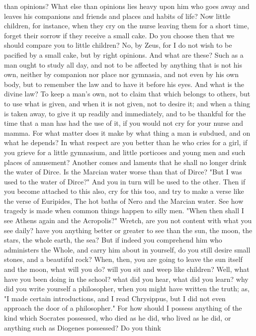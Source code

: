 \documentclass[a4paper]{article}
\begin{document}
than opinions? What else than opinions lies heavy upon him who goes away and
leaves his companions and friends and places and habits of life? Now little
children, for instance, when they cry on the nurse leaving them for a short
time, forget their sorrow if they receive a small cake. Do you choose then that
we should compare you to little children? No, by Zeus, for I do not wish to be
pacified by a small cake, but by right opinions. And what are these? Such as a
man ought to study all day, and not to be affected by anything that is not his
own, neither by companion nor place nor gymnasia, and not even by his own body,
but to remember the law and to have it before his eyes. And what is the divine
law? To keep a man's own, not to claim that which belongs to others, but to use
what is given, and when it is not given, not to desire it; and when a thing is
taken away, to give it up readily and immediately, and to be thankful for the
time that a man has had the use of it, if you would not cry for your nurse and
mamma. For what matter does it make by what thing a man is subdued, and on what
he depends? In what respect are you better than he who cries for a girl, if you
grieve for a little gymnasium, and little porticoes and young men and such
places of amusement? Another comes and laments that he shall no longer drink
the water of Dirce. Is the Marcian water worse than that of Dirce? "But I was
used to the water of Dirce?" And you in turn will be used to the other. Then if
you become attached to this also, cry for this too, and try to make a verse
like the verse of Euripides,
       The hot baths of Nero and the Marcian water.
See how tragedy is made when common things happen to silly men.
    "When then shall I see Athens again and the Acropolis?" Wretch, are you not
content with what you see daily? have you anything better or greater to see
than the sun, the moon, the stars, the whole earth, the sea? But if indeed you
comprehend him who administers the Whole, and carry him about in yourself, do
you still desire small stones, and a beautiful rock? When, then, you are going
to leave the sun itself and the moon, what will you do? will you sit and weep
like children? Well, what have you been doing in the school? what did you hear,
what did you learn? why did you write yourself a philosopher, when you might
have written the truth; as, "I made certain introductions, and I read
Chrysippus, but I did not even approach the door of a philosopher." For how
should I possess anything of the kind which Socrates possessed, who died as he
did, who lived as he did, or anything such as Diogenes possessed? Do you think
\end{document}
